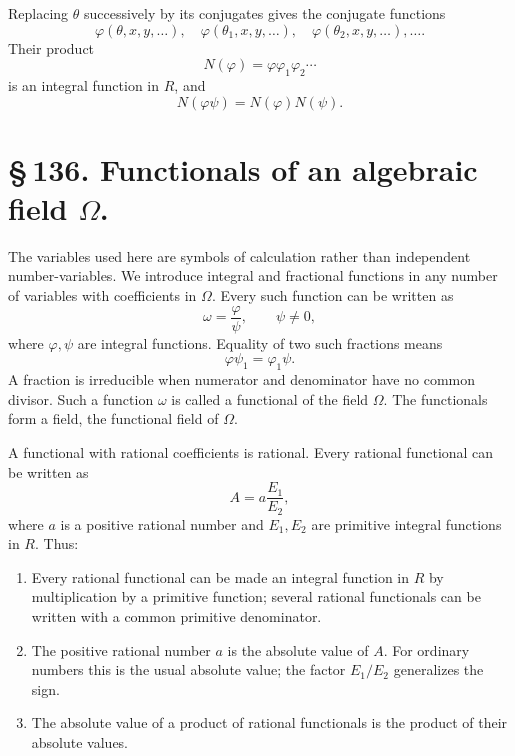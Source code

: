 \documentclass[11pt]{article}
\begin{document}
Replacing \(\theta\) successively by its conjugates gives the
conjugate functions
\begin{equation}
\varphi(\theta,x,y,\ldots),\quad
\varphi(\theta_1,x,y,\ldots),\quad
\varphi(\theta_2,x,y,\ldots),\ldots .
\tag{5}
\end{equation}
Their product
\begin{equation}
N(\varphi)=\varphi\varphi_1\varphi_2\cdots
\tag{6}
\end{equation}
is an integral function in \(R\), and
\begin{equation}
N(\varphi\psi)=N(\varphi)N(\psi).
\tag{7}
\end{equation}

\section*{\S\,136. Functionals of an algebraic field \(\Omega\).}

The variables used here are symbols of calculation rather than
independent number-variables. We introduce integral and fractional
functions in any number of variables with coefficients in
\(\Omega\). Every such function can be written as
\[
\omega=\frac{\varphi}{\psi},\qquad \psi\neq 0,
\]
where \(\varphi,\psi\) are integral functions. Equality of two such
fractions means
\[
\varphi\psi_1=\varphi_1\psi.
\]
A fraction is irreducible when numerator and denominator have no
common divisor. Such a function \(\omega\) is called a functional of
the field \(\Omega\). The functionals form a field, the functional
field of \(\Omega\).

A functional with rational coefficients is rational. Every rational
functional can be written as
\[
A=a\frac{E_1}{E_2},
\]
where \(a\) is a positive rational number and \(E_1,E_2\) are
primitive integral functions in \(R\). Thus:
\begin{enumerate}[label=\arabic*.]
\item Every rational functional can be made an integral function in
\(R\) by multiplication by a primitive function; several rational
functionals can be written with a common primitive denominator.

\item The positive rational number \(a\) is the absolute value of
\(A\). For ordinary numbers this is the usual absolute value; the
factor \(E_1/E_2\) generalizes the sign.

\item The absolute value of a product of rational functionals is the
product of their absolute values.
\end{enumerate}
\end{document}

